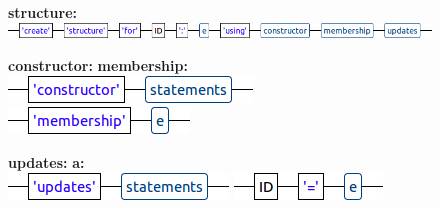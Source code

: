 \begin{figure}[!ht]
\textbf{structure:}\\
\vspace{0.2cm}
\hspace{1cm}\includegraphics[scale=0.37]{./annex/images/structure.png}

\textbf{constructor:} \hspace{4.75cm} \textbf{membership:}\\
\vspace{0.2cm}
\hspace{1cm}\includegraphics[scale=0.37]{./annex/images/constructor.png} \hspace{4cm}\includegraphics[scale=0.37]{./annex/images/membership.png}

\textbf{updates:} \hspace{5.4cm} \textbf{a:}\\
\vspace{0.2cm}
\hspace{1cm}\includegraphics[scale=0.37]{./annex/images/updates.png} \hspace{4cm} \includegraphics[scale=0.37]{./annex/images/a.png}

\end{figure}

